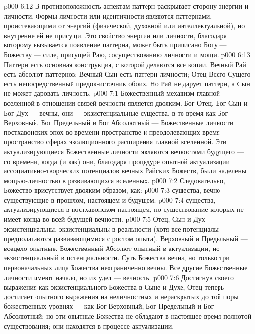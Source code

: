 \vs p000 6:12 В противоположность аспектам  паттерн раскрывает  сторону энергии и личности. Формы личности или идентичности являются паттернами, проистекающими от энергий (физической, духовной или интеллектуальной), но внутренне ей не присущи. Это свойство энергии или личности, благодаря которому вызывается появление паттерна, может быть приписано Богу --- Божеству --- силе, присущей Раю, сосуществованию личности и мощи.
\vs p000 6:13 Паттерн есть основная конструкция, с которой делаются все копии. Вечный Рай есть абсолют паттернов; Вечный Сын есть паттерн личности; Отец Всего Сущего есть непосредственный предок\hyp{}источник обоих. Но Рай не дарует паттерн, а Сын не может даровать личность.
\vs p000 7:1 Божественный механизм главной вселенной в отношении связей вечности является двояким. Бог Отец, Бог Сын и Бог Дух --- вечны, они --- экзистенциальные существа, в то время как Бог Верховный, Бог Предельный и Бог Абсолютный ---  Божественные личности постхавонских эпох во времени\hyp{}пространстве и преодолевающих время\hyp{}пространство сферах эволюционного расширения главной вселенной. Эти актуализирующиеся Божественные личности являются вечностями будущего --- со времени, когда (и как) они, благодаря процедуре опытной актуализации ассоциативно\hyp{}творческих потенциалов вечных Райских Божеств, были наделены мощью\hyp{}личностью в развивающихся вселенных.
\vs p000 7:2 Следовательно, Божество присутствует двояким образом, как:
\vs p000 7:3 \bibnobreakspace {} существа, вечно существующие в прошлом, настоящем и будущем.
\vs p000 7:4 \bibnobreakspace {} существа, актуализирующиеся в постхавонском настоящем, но существование которых не имеет конца во всей будущей вечности.
\vs p000 7:5 \pc Отец, Сын и Дух --- экзистенциальны, экзистенциальны в реальности (хотя все потенциалы предполагаются развивающимися с ростом опыта). Верховный и Предельный --- всецело опытные. Божественный Абсолют опытный в актуализации, но экзистенциальный в потенциальности. Суть Божества вечна, но только три первоначальных лица Божества неограниченно вечны. Все другие Божественные личности имеют начало, но их удел --- вечность.
\vs p000 7:6 Достигнув своего выражения как экзистенциального Божества в Сыне и Духе, Отец теперь достигает опытного выражения на неличностных и нераскрытых до той поры божественных уровнях --- как Бог Верховный, Бог Предельный и Бог Абсолютный; но эти опытные Божества не обладают в настоящее время полнотой существования; они находятся в процессе актуализации.
